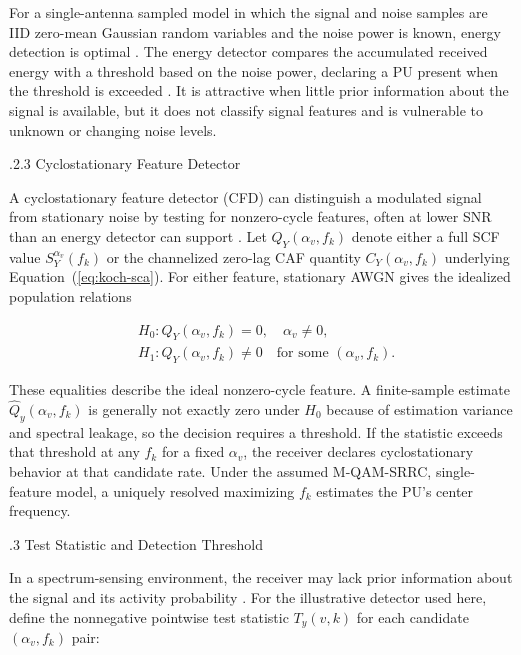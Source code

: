 For a single-antenna sampled model in which the signal and noise samples are IID zero-mean Gaussian random variables and the noise power is known, energy detection is optimal \cite{liang-20}.  The energy detector compares the accumulated received energy with a threshold based on the noise power, declaring a PU present when the threshold is exceeded \cite{ilyas-16,liang-20}.  It is attractive when little prior information about the signal is available, but it does not classify signal features and is vulnerable to unknown or changing noise levels.

%
%
\bigskip
{}
.2.3 \quad Cyclostationary Feature Detector

A cyclostationary feature detector (CFD) can distinguish a modulated signal from stationary noise by testing for nonzero-cycle features, often at lower SNR than an energy detector can support \cite{ilyas-16}.  Let $Q_Y(\alpha_v,f_k)$ denote either a full SCF value $S_Y^{\alpha_v}(f_k)$ or the channelized zero-lag CAF quantity $C_Y(\alpha_v,f_k)$ underlying Equation~(\ref{eq:koch-sca}).  For either feature, stationary AWGN gives the idealized population relations

\begin{align}
  &H_{0}:Q_{Y}(\alpha_v,f_k)=0, \quad \alpha_v\neq0,                         \label{eq:h0_caf} \\
  &H_{1}:Q_{Y}(\alpha_v,f_k)\neq0 \quad \text{for some }(\alpha_v,f_k). \label{eq:h1_caf}
\end{align}

These equalities describe the ideal nonzero-cycle feature.  A finite-sample estimate $\widehat{Q}_{y}(\alpha_v,f_k)$ is generally not exactly zero under $H_0$ because of estimation variance and spectral leakage, so the decision requires a threshold.  If the statistic exceeds that threshold at any $f_k$ for a fixed $\alpha_v$, the receiver declares cyclostationary behavior at that candidate rate.  Under the assumed M-QAM-SRRC, single-feature model, a uniquely resolved maximizing $f_k$ estimates the PU's center frequency.

%
%
\bigskip
{}
.3 \quad Test Statistic and Detection Threshold

In a spectrum-sensing environment, the receiver may lack prior information about the signal and its activity probability \cite{liang-20}.  For the illustrative detector used here, define the nonnegative pointwise test statistic $T_y(v,k)$ for each candidate $(\alpha_v,f_k)$ pair:

